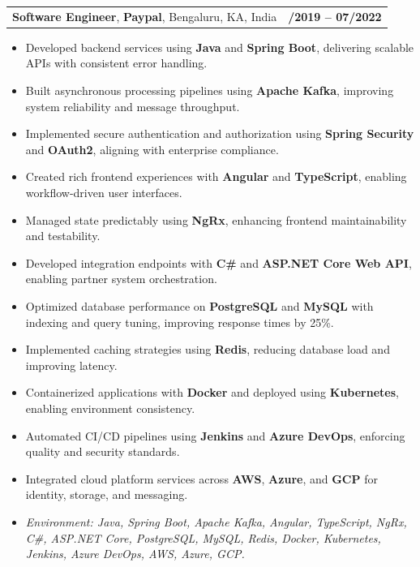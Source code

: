\documentclass[letterpaper,11pt]{article}
\makeatletter
\newcommand{\resumeItem}[1]{
  \item\footnotesize{
    {#1 \vspace{-2pt}}
  }
}
\newcommand{\resumeSubheading}[4]{
  \vspace{-2pt}\item
    \begin{tabular*}{1.0\textwidth}[t]{l@{\extracolsep{\fill}}r}
      \textbf{\fontsize{10pt}{14pt}\selectfont #3}, \textbf{\fontsize{10pt}{14pt}\selectfont #1}, \fontsize{10pt}{14pt}\selectfont #4 & \textbf{\fontsize{10pt}{14pt}\selectfont #2} \\
    \end{tabular*}\vspace{-7pt}
}
\newcommand{\resumeItemListStart}{\begin{itemize}[leftmargin=*]}
\newcommand{\resumeItemListEnd}{\end{itemize}\vspace{-5pt}}
\makeatother
\begin{document}
\resumeSubheading
{Paypal}{08/2019 -- 07/2022}
{Software Engineer}{Bengaluru, KA, India}
\resumeItemListStart
  \resumeItem{Developed backend services using \textbf{Java} and \textbf{Spring Boot}, delivering scalable APIs with consistent error handling.}
  \resumeItem{Built asynchronous processing pipelines using \textbf{Apache Kafka}, improving system reliability and message throughput.}
  \resumeItem{Implemented secure authentication and authorization using \textbf{Spring Security} and \textbf{OAuth2}, aligning with enterprise compliance.}
  \resumeItem{Created rich frontend experiences with \textbf{Angular} and \textbf{TypeScript}, enabling workflow-driven user interfaces.}
  \resumeItem{Managed state predictably using \textbf{NgRx}, enhancing frontend maintainability and testability.}
  \resumeItem{Developed integration endpoints with \textbf{C\#} and \textbf{ASP.NET Core Web API}, enabling partner system orchestration.}
  \resumeItem{Optimized database performance on \textbf{PostgreSQL} and \textbf{MySQL} with indexing and query tuning, improving response times by 25\%.}
  \resumeItem{Implemented caching strategies using \textbf{Redis}, reducing database load and improving latency.}
  \resumeItem{Containerized applications with \textbf{Docker} and deployed using \textbf{Kubernetes}, enabling environment consistency.}
  \resumeItem{Automated CI/CD pipelines using \textbf{Jenkins} and \textbf{Azure DevOps}, enforcing quality and security standards.}
  \resumeItem{Integrated cloud platform services across \textbf{AWS}, \textbf{Azure}, and \textbf{GCP} for identity, storage, and messaging.}
  \resumeItem{\textit{Environment: Java, Spring Boot, Apache Kafka, Angular, TypeScript, NgRx, C\#, ASP.NET Core, PostgreSQL, MySQL, Redis, Docker, Kubernetes, Jenkins, Azure DevOps, AWS, Azure, GCP.}}
\resumeItemListEnd
\end{document}
